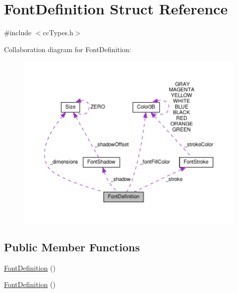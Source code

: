 \hypertarget{structFontDefinition}{}\section{Font\+Definition Struct Reference}
\label{structFontDefinition}


{\ttfamily \#include $<$cc\+Types.\+h$>$}



Collaboration diagram for Font\+Definition\+:
\nopagebreak
\begin{figure}[H]
\begin{center}
\leavevmode
\includegraphics[width=350pt]{structFontDefinition__coll__graph}
\end{center}
\end{figure}
\subsection*{Public Member Functions}
\begin{DoxyCompactItemize}
\item 
\hyperlink{structFontDefinition_afe2bf23fedc23ab6fa52b9c3587c0b10}{Font\+Definition} ()
\item 
\hyperlink{structFontDefinition_afe2bf23fedc23ab6fa52b9c3587c0b10}{Font\+Definition} ()
\end{DoxyCompactItemize}
